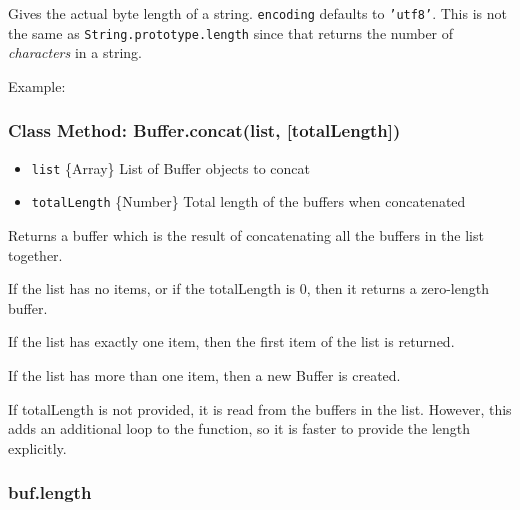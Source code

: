 Gives the actual byte length of a string. \texttt{encoding} defaults to
\texttt{'utf8'}. This is not the same as
\texttt{String.prototype.length} since that returns the number of
\emph{characters} in a string.

Example:

\begin{Shaded}
\begin{Highlighting}[]
\NormalTok{;}

 \NormalTok{+ } \NormalTok{+ } \NormalTok{+}
  \NormalTok{) + }\NormalTok{);}

\end{Highlighting}
\end{Shaded}

\subsubsection{Class Method: Buffer.concat(list, {[}totalLength{]})}

\begin{itemize}
\item
  \texttt{list} \{Array\} List of Buffer objects to concat
\item
  \texttt{totalLength} \{Number\} Total length of the buffers when
  concatenated
\end{itemize}

Returns a buffer which is the result of concatenating all the buffers in
the list together.

If the list has no items, or if the totalLength is 0, then it returns a
zero-length buffer.

If the list has exactly one item, then the first item of the list is
returned.

If the list has more than one item, then a new Buffer is created.

If totalLength is not provided, it is read from the buffers in the list.
However, this adds an additional loop to the function, so it is faster
to provide the length explicitly.

\subsubsection{buf.length}

